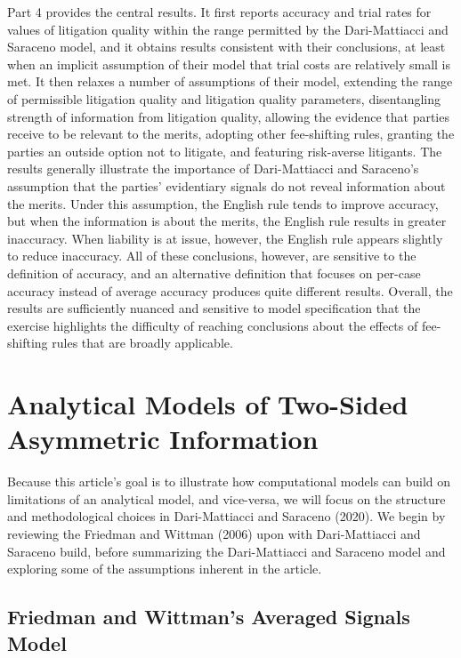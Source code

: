 \documentclass{article}
\begin{document}
Part 4 provides the central results. It first reports accuracy and trial rates for values of litigation quality within the range permitted by the Dari-Mattiacci and Saraceno model, and it obtains results consistent with their conclusions, at least when an implicit assumption of their model that trial costs are relatively small is met. It then relaxes a number of assumptions of their model, extending the range of permissible litigation quality and litigation quality parameters, disentangling strength of information from litigation quality, allowing the evidence that parties receive to be relevant to the merits, adopting other fee-shifting rules, granting the parties an outside option not to litigate, and featuring risk-averse litigants. The results generally illustrate the importance of Dari-Mattiacci and Saraceno's assumption that the parties' evidentiary signals do not reveal information about the merits. Under this assumption, the English rule tends to improve accuracy, but when the information is about the merits, the English rule results in greater inaccuracy. When liability is at issue, however, the English rule appears slightly to reduce inaccuracy. All of these conclusions, however, are sensitive to the definition of accuracy, and an alternative definition that focuses on per-case accuracy instead of average accuracy produces quite different results. Overall, the results are sufficiently nuanced and sensitive to model specification that the exercise highlights the difficulty of reaching conclusions about the effects of fee-shifting rules that are broadly applicable. 

\section{Analytical Models of Two-Sided Asymmetric Information}

Because this article's goal is to illustrate how computational models can build on limitations of an analytical model, and vice-versa, we will focus on the structure and methodological choices in Dari-Mattiacci and Saraceno (2020). We begin by reviewing the Friedman and Wittman (2006) \cite{friedmanwittman} upon with Dari-Mattiacci and Saraceno build, before summarizing the Dari-Mattiacci and Saraceno model and exploring some of the assumptions inherent in the article.

\subsection{Friedman and Wittman's Averaged Signals Model}
\end{document}
